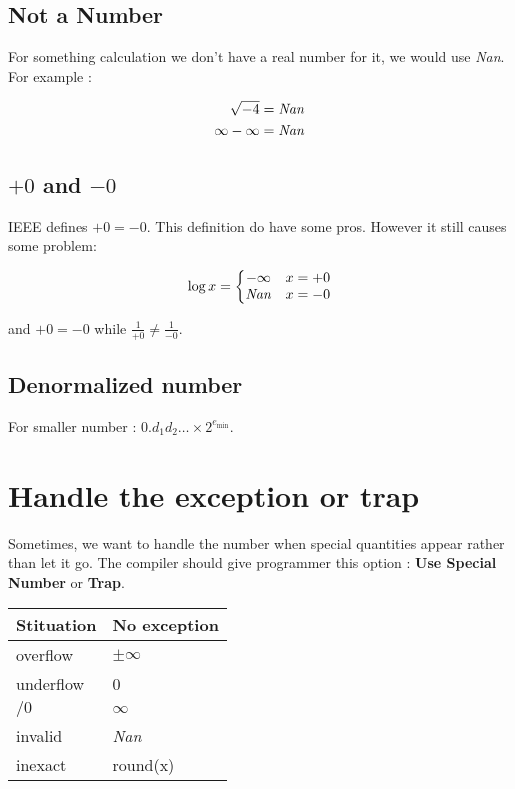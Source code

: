 \documentclass{article}
\begin{document}
        \subsection{Not a Number}
        For something calculation we don't have a real number for it, we would use {\it Nan}.
        For example :

        \begin{align}
            \sqrt{-4} &= \it{Nan}       \nonumber \\
            \infty - \infty &= \it{Nan} \nonumber
        \end{align}

        \subsection{$+0$ and $-0$}

        IEEE defines $+0 = -0$. This definition do have some pros.
        However it still causes some problem:

        \[
            \log x = 
            \left \{
                \begin{matrix}
                    -\infty   & x = +0  \\
                    \it{Nan} & x = -0  \\
                \end{matrix}
            \right.
        \]

        and $+0 = -0$ while $\frac{1}{+0} \neq \frac{1}{-0}$.

        \subsection{Denormalized number}

        For smaller number : $0.d_1d_2 \dots \times 2^{e_{\min}}$.

        \section{Handle the exception or trap}
        
        Sometimes, we want to handle the number when special quantities appear rather than let it go.
        The compiler should give programmer this option :
        \textbf{Use Special Number} or \textbf{Trap}.

        \begin{center}
            \begin{tabular}{ | l | l |}
                \hline
                Stituation & No exception  \\ \hline
                overflow   & $\pm \infty$  \\ \hline
                underflow  & 0             \\ \hline
                $/0$       & $\infty$      \\ \hline
                invalid    & {\it Nan}     \\ \hline 
                inexact    & round(x)      \\ \hline
            \end{tabular}
        \end{center}
\end{document}
